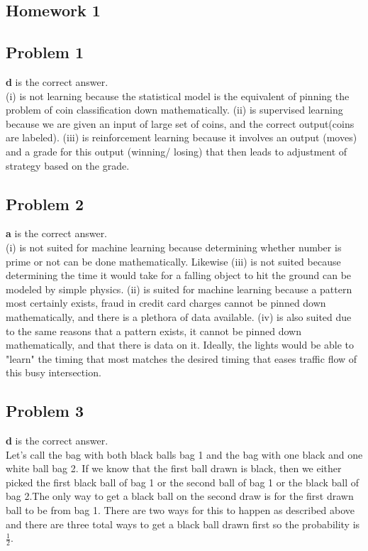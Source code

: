 \documentclass[12 pt]{article}
\begin{document}
	\begin{center}
		\section*{Homework 1}
	\end{center}
	\subsection*{Problem 1}
	
	\textbf{d} is the correct answer. \\
	(i) is not learning because the statistical model is the equivalent of pinning the problem of coin classification down mathematically. (ii) is supervised learning because  we are given an input of large set of coins, and the correct output(coins are labeled). (iii) is reinforcement learning because it involves an output (moves) and a grade for this output (winning/ losing) that then leads to adjustment of strategy based on the grade.
	
	
	\subsection*{Problem 2}
	
	\textbf{a} is the correct answer. \\
	(i) is not suited for machine learning because determining whether number is prime or not can be done mathematically. Likewise (iii) is not suited because determining the time it would take for a falling object to hit the ground can be modeled by simple physics. (ii) is suited for machine learning because a pattern most certainly exists, fraud in credit card charges cannot be pinned down mathematically, and there is a plethora of data available. (iv) is also suited due to the same reasons that a pattern exists, it cannot be pinned down mathematically, and that there is data on it. Ideally, the lights would be able to "learn" the timing that most matches the desired timing that eases traffic flow of this busy intersection.
	
	\subsection*{Problem 3}
	
	\textbf{d} is the correct answer. \\
	Let's call the bag with both black balls bag 1 and the bag with one black and one white ball bag 2. If we know that the first ball drawn is black, then we either picked the first black ball of bag 1 or the second ball of bag 1 or the black ball of bag 2.The only way to get a black ball on the second draw is for the first drawn ball to be from bag 1. There are two ways for this to happen as described above and there are three total ways to get a black ball drawn first so the probability is \(\frac{1}{2}\).
	
\end{document}
